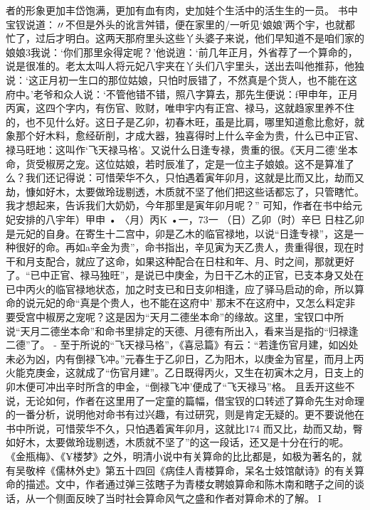 者的形象更加丰岱饱满，更加有血有肉，史加娃个生活中的活生生的一员。
书中宝钗说道：〃不但是外头的讹言舛错，便在家里的/一听见‘娘娘’两个宇，也就都忙了，过后才明白。这两天那府里头这些丫头婆子来说，他们早知道不是咱们家的娘娘3我说：‘你们那里汆得定呢？’他说逍：‘前几年正月，外省荐了一个算命的，说是很准的。老太太叫人将元妃八宇夹在丫头们八宇里头，送出去叫他推荪，他独说：‘这正月初一生口的那位姑娘，只怕时辰错了，不然真是个货人，也不能在这府中。’老爷和众人说：‘不管他错不错，照八字算去，那先生便说：f甲申年，正月丙寅，这四个字内，有伤官、败财，唯申宇内有正宫、禄马，这就趋家里养不住的，也不见什么好。这日子是乙卯，初春木旺，虽是比肩，哪里知道愈比愈好，就象那个好木料，愈经斫削，才成大器，独喜得时上什么辛金为贵，什么已中正官、禄马旺地：这叫作‘飞天禄马格’。又说什么日逢专禄，贵重的很。《天月二德’坐本命，货受椒房之宠。这位姑娘，若时辰准了，定是一位主子娘娘。这不是算准了么？我们还记得说：可惜荣华不久，只怕遇着寅年卯月，这就是比而又比，劫而又劫，慷如好木，太要做玲珑剔透，木质就不坚了他们把这些话都忘了，只管瞎忙。我才想起来，告诉我们大奶奶，今年那里是寅年卯月呢？”
可知，作者在书中给元妃安排的八宇年）甲申	•
〈月）丙K
•一，73一
（日）乙卯（时）辛巳
日柱乙卯是元妃的自身。在寄生十二宫中，卯是乙木的临官禄地，以说“日逢专禄”，这是一种很好的命。再如a辛金为贵”，命书指出，辛见寅为天乙贵人，贵重得很，现在时干和月支配合，就应了这命，如果这种配合在日柱和年、月、时之间，那就更好了。“已中正官、禄马独旺”，是说已中庚金，为日干乙木的正官，已支本身又处在已中丙火的临官禄地状态，加之时支已和日支卯相逢，应了驿马启动的命，所以算命的说元妃的命“真是个贵人，也不能在这府中'
那末不在这府中，又怎么料定非要受宫中椒房之宠呢？这是因为“天月二德坐本命”的缘故。这里，宝钗口中所说“天月二德坐本命”和命书里排定的天德、月德有所出入，看来当是指的“归禄逢二德”了。	-
至于所说的“飞天禄马格”，《喜忌篇》有云：“若逢伤官月建，如凶处未必为凶，内有倒禄飞冲。”元春生于乙卯日，乙为阳木，以庚金为官星，而月上丙火能克庚金，这就成了“伤官月建”。乙日既得丙火，又生在初寅木之月，日支上的卯木便可冲出辛时所含的申金，“倒禄飞冲'便成了“飞天禄马”格。
且丢开这些不说，无论如何，作者在这里用了一定童的篇幅，借宝钗的口转述了算命先生对命理的一番分析，说明他对命书有过兴趣，有过研究，则是肯定无疑的。更不要说他在书中所说，可惜荥华不久，只怕遇着寅年卯月，这就比174
而又比，劫而又劫，臀如好木，太要做玲珑剔透，木质就不坚了”的这一段话，还又是十分在行的呢。
《金瓶梅》、《¥楼梦》之外，明清小说中有关算命的比比都是，如极为著名的，就有吴敬梓《儒林外史》第五十四回《病佳人青楼算命，呆名士妓馆献诗》的有关算命的描述。文中，作者通过弹三弦瞎子为青楼女聘娘算命和陈木南和瞎子之间的谈话，从一个侧面反映了当时社会算命风气之盛和作者对算命术的了解。
I
